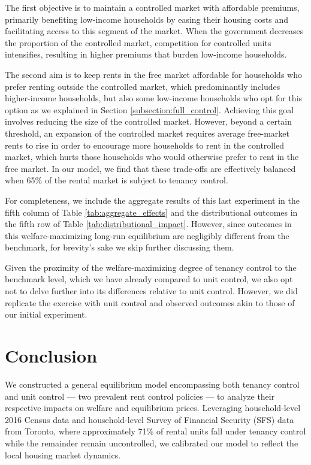 \documentclass[parskip=full]{article}
\begin{document}
The first objective is to maintain a controlled market with affordable premiums, primarily benefiting low-income households by easing their housing costs and facilitating access to this segment of the market. When the government decreases the proportion of the controlled market, competition for controlled units intensifies, resulting in higher premiums that burden low-income households.

The second aim is to keep rents in the free market affordable for households who prefer renting outside the controlled market, which predominantly includes higher-income households, but also some low-income households who opt for this option as we explained in Section \ref{subsection:full_control}. Achieving this goal involves reducing the size of the controlled market. However, beyond a certain threshold, an expansion of the controlled market requires average free-market rents to rise in order to encourage more households to rent in the controlled market, which hurts those households who would otherwise prefer to rent in the free market. In our model, we find that these trade-offs are effectively balanced when 65\% of the rental market is subject to tenancy control.

For completeness, we include the aggregate results of this last experiment in the fifth column of Table \ref{tab:aggregate_effects} and the distributional outcomes in the fifth row of Table \ref{tab:distributional_impact}. However, since outcomes in this welfare-maximizing long-run equilibrium are negligibly different from the benchmark, for brevity's sake we skip further discussing them.

Given the proximity of the welfare-maximizing degree of tenancy control to the benchmark level, which we have already compared to unit control, we also opt not to delve further into its differences relative to unit control. However, we did replicate the exercise with unit control and observed outcomes akin to those of our initial experiment.

\section{Conclusion}\label{sec:conclusion}

We constructed a general equilibrium model encompassing both tenancy control and unit control --- two prevalent rent control policies --- to analyze their respective impacts on welfare and equilibrium prices. Leveraging household-level 2016 Census data and household-level Survey of Financial Security (SFS) data from Toronto, where approximately 71\% of rental units fall under tenancy control while the remainder remain uncontrolled, we calibrated our model to reflect the local housing market dynamics.
\end{document}
